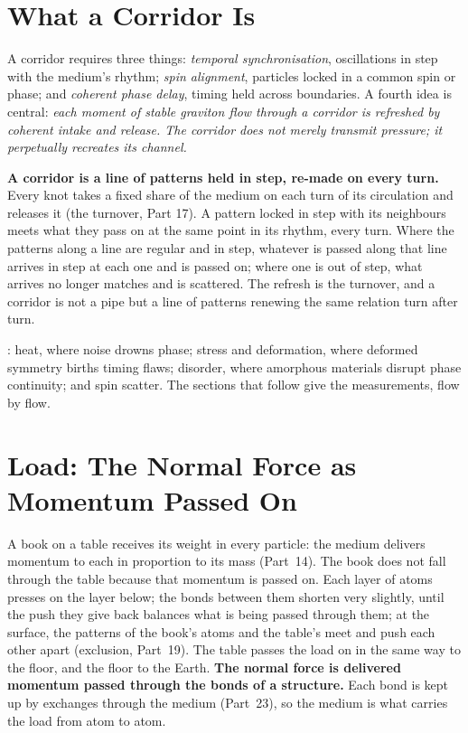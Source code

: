 \documentclass[11pt,a4paper]{article}
\begin{document}
\section{What a Corridor Is}
\label{sec:corridor}

A corridor requires three things: \emph{temporal synchronisation}, oscillations in step with the medium's rhythm; \emph{spin alignment}, particles locked in a common spin or phase; and \emph{coherent phase delay}, timing held across boundaries. A fourth idea is central: \emph{each moment of stable graviton flow through a corridor is refreshed by coherent intake and release. The corridor does not merely transmit pressure; it perpetually recreates its channel.}

\begin{hypbar}
\textbf{A corridor is a line of patterns held in step, re-made on every turn.} Every knot takes a fixed share of the medium on each turn of its circulation and releases it (the turnover, Part 17). A pattern locked in step with its neighbours meets what they pass on at the same point in its rhythm, every turn. Where the patterns along a line are regular and in step, whatever is passed along that line arrives in step at each one and is passed on; where one is out of step, what arrives no longer matches and is scattered. The refresh is the turnover, and a corridor is not a pipe but a line of patterns renewing the same relation turn after turn.
\end{hypbar}

: heat, where noise drowns phase; stress and deformation, where deformed symmetry births timing flaws; disorder, where amorphous materials disrupt phase continuity; and spin scatter. The sections that follow give the measurements, flow by flow.

\section{Load: The Normal Force as Momentum Passed On}
\label{sec:load}

\begin{hypbar}
A book on a table receives its weight in every particle: the medium delivers momentum to each in proportion to its mass (Part~14).\footnotemark{} The book does not fall through the table because that momentum is passed on. Each layer of atoms presses on the layer below; the bonds between them shorten very slightly, until the push they give back balances what is being passed through them; at the surface, the patterns of the book's atoms and the table's meet and push each other apart (exclusion, Part~19). The table passes the load on in the same way to the floor, and the floor to the Earth. \textbf{The normal force is delivered momentum passed through the bonds of a structure.} Each bond is kept up by exchanges through the medium (Part~23),\footnotemark{} so the medium is what carries the load from atom to atom.
\end{hypbar}
\addtocounter{footnote}{-1}
\end{document}
